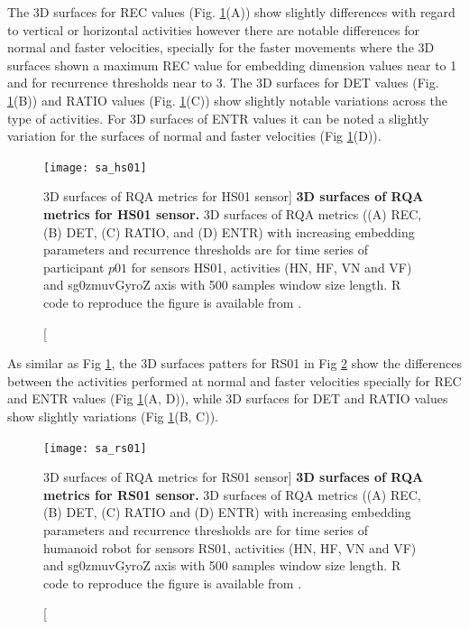 The 3D surfaces for REC values (Fig. \ref{fig:topo_sa_hs01}(A))
show slightly differences with regard to vertical or horizontal activities
however there are notable differences for normal and faster velocities, 
specially for the faster movements where the 3D surfaces shown a maximum
REC value for embedding dimension values near to 1 and for recurrence 
thresholds near to 3. 
The 3D surfaces for DET values  
(Fig. \ref{fig:topo_sa_hs01}(B)) and RATIO values 
(Fig. \ref{fig:topo_sa_hs01}(C)) show slightly notable variations across 
the type of activities. 
For 3D surfaces of ENTR values it can be noted a slightly variation for
the surfaces of normal and faster velocities (Fig \ref{fig:topo_sa_hs01}(D)).
\begin{figure}
\centering
\texttt{[image: sa\_hs01]}
    \caption
	[3D surfaces of RQA metrics for HS01 sensor]{
	{\bf 3D surfaces of RQA metrics for HS01 sensor.}
	3D surfaces of RQA metrics ((A) REC, (B) DET, (C) RATIO, and (D) ENTR) 
	with increasing embedding parameters and recurrence thresholds 
	are for time series of participant $p01$ for 
	sensors HS01, activities (HN, HF, VN and VF) and 
	sg0zmuvGyroZ axis with 500 samples window size length. 
	R code to reproduce the figure is available from \cite{hwum2018}.
       }
\label{fig:topo_sa_hs01}
\end{figure}

As similar as Fig \ref{fig:topo_sa_hs01}, the 3D surfaces patters 
for RS01 in Fig \ref{fig:topo_sa_rs01} show the differences between 
the activities performed at normal and faster velocities
specially for REC and ENTR values (Fig \ref{fig:topo_sa_hs01}(A, D)),
while 3D surfaces for DET and RATIO values show slightly variations
(Fig \ref{fig:topo_sa_hs01}(B, C)).
\begin{figure}
\centering
\texttt{[image: sa\_rs01]}
    \caption
	[3D surfaces of RQA metrics for RS01 sensor]{
	{\bf 3D surfaces of RQA metrics for RS01 sensor.}
	3D surfaces of RQA metrics ((A) REC, (B) DET, (C) RATIO and (D) ENTR) 
	with increasing embedding parameters and recurrence thresholds 
	are for time series of humanoid robot for 
	sensors RS01, activities (HN, HF, VN and VF) and 
	sg0zmuvGyroZ axis with 500 samples window size length. 
	R code to reproduce the figure is available from \cite{hwum2018}.
       }
\label{fig:topo_sa_rs01}
\end{figure}








